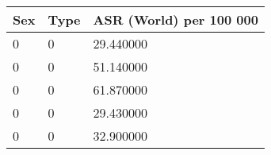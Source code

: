 \begin{tabular}{p{1cm}p{1.5cm}p{2.5cm}}
\toprule
Sex & Type & ASR (World) per 100 000 \\
\midrule
0 & 0 & 29.440000 \\
0 & 0 & 51.140000 \\
0 & 0 & 61.870000 \\
0 & 0 & 29.430000 \\
0 & 0 & 32.900000 \\
\bottomrule
\end{tabular} 